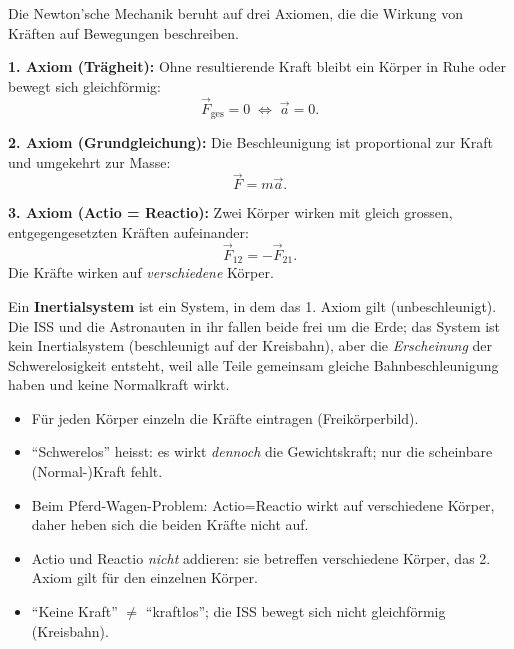 

Die Newton'sche Mechanik beruht auf drei Axiomen, die die Wirkung von
Kräften auf Bewegungen beschreiben.

\begin{werkzeugkasten}[Werkzeuge]
\textbf{1. Axiom (Trägheit):} Ohne resultierende Kraft bleibt ein Körper
in Ruhe oder bewegt sich gleichförmig:
\begin{equation}
  \vec F_{\mathrm{ges}}=0\;\Leftrightarrow\;\vec a=0.
\end{equation}

\textbf{2. Axiom (Grundgleichung):} Die Beschleunigung ist proportional zur
Kraft und umgekehrt zur Masse:
\begin{equation}
  \vec F=m\vec a.
\end{equation}

\textbf{3. Axiom (Actio = Reactio):} Zwei Körper wirken mit gleich grossen,
entgegengesetzten Kräften aufeinander:
\begin{equation}
  \vec F_{12}=-\vec F_{21}.
\end{equation}
Die Kräfte wirken auf \emph{verschiedene} Körper.
\end{werkzeugkasten}

\begin{werkzeugkasten}
Ein \textbf{Inertialsystem} ist ein System, in dem das 1. Axiom gilt
(unbeschleunigt). Die ISS und die Astronauten in ihr fallen beide frei
um die Erde; das System ist kein Inertialsystem (beschleunigt auf der
Kreisbahn), aber die \emph{Erscheinung} der Schwerelosigkeit entsteht,
weil alle Teile gemeinsam gleiche Bahnbeschleunigung haben und keine
Normalkraft wirkt.
\end{werkzeugkasten}

\begin{werkzeugkasten}[Vorgehen]
\begin{itemize}
  \item Für jeden Körper einzeln die Kräfte eintragen (Freikörperbild).
  \item ``Schwerelos'' heisst: es wirkt \emph{dennoch} die Gewichtskraft;
        nur die scheinbare (Normal-)Kraft fehlt.
  \item Beim Pferd-Wagen-Problem: Actio=Reactio wirkt auf verschiedene
        Körper, daher heben sich die beiden Kräfte nicht auf.
\end{itemize}
\end{werkzeugkasten}

\begin{achtung}
\begin{itemize}
  \item Actio und Reactio \emph{nicht} addieren: sie betreffen verschiedene
        Körper, das 2. Axiom gilt für den einzelnen Körper.
  \item ``Keine Kraft'' $\neq$ ``kraftlos''; die ISS bewegt sich nicht
        gleichförmig (Kreisbahn).
\end{itemize}
\end{achtung}
